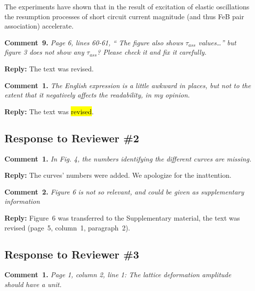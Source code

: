 \documentclass[sn-mathphys]{sn-jnl}
\begin{document}
The experiments have shown that in the result of excitation of elastic oscillations the resumption processes of short circuit current magnitude (and thus FeB pair association) accelerate.


\vspace{1cm}
\noindent
\textcolor[rgb]{0.00,0.50,1.00}{\textbf{Comment~9.}}
\emph{Page 6, lines 60-61, “ The figure also shows $\tau_{ass}$ values…” but figure 3 does not show any $\tau_{ass}$?
Please check it and fix it carefully.}

\noindent
\textcolor[rgb]{0.51,0.00,0.00}{\textbf{Reply:}}
The text was revised.



\noindent
\textcolor[rgb]{0.00,0.50,1.00}{\textbf{Comment~1.}}
\emph{The English expression is a little awkward in places, but not to the extent that it negatively affects the readability, in my opinion.}

\noindent
\textcolor[rgb]{0.51,0.00,0.00}{\textbf{Reply:}}
The text was \hl{revised}.


\subsection*{Response to Reviewer \#2 }

\noindent
\textcolor[rgb]{0.00,0.50,1.00}{\textbf{Comment~1.}}
\emph{In Fig. 4, the numbers identifying the different curves are missing.}

\noindent
\textcolor[rgb]{0.51,0.00,0.00}{\textbf{Reply:}}
The curves' numbers were added.
We apologize for the inattention.


\vspace{1cm}
\noindent
\textcolor[rgb]{0.00,0.50,1.00}{\textbf{Comment~2.}}
\emph{Figure 6 is not so relevant, and could be given as supplementary information}

\noindent
\textcolor[rgb]{0.51,0.00,0.00}{\textbf{Reply:}}
Figure~6 was transferred to the Supplementary material,
the text was revised (page~5, column~1, paragraph~2).


\subsection*{Response to Reviewer \#3 }

\noindent
\textcolor[rgb]{0.00,0.50,1.00}{\textbf{Comment~1.}}
\emph{Page 1, column 2, line 1: The lattice deformation amplitude should have a unit.}
\end{document}
